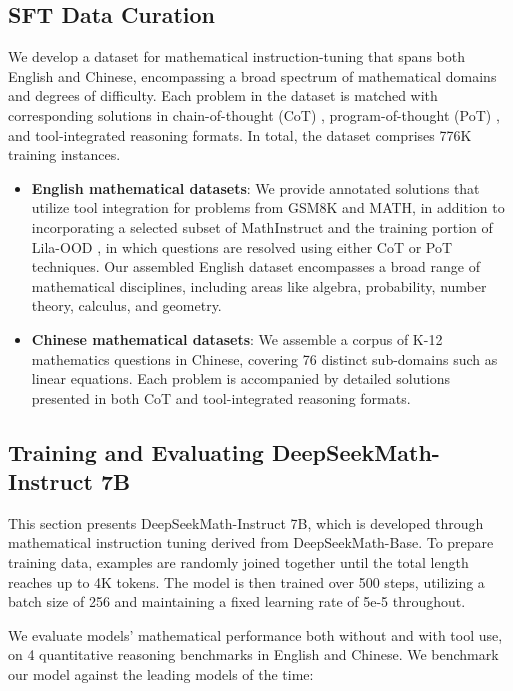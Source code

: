 \begin{itemize}[topsep=0pt]
\subsection{SFT Data Curation}

We develop a dataset for mathematical instruction-tuning that spans both English and Chinese, encompassing a broad spectrum of mathematical domains and degrees of difficulty. Each problem in the dataset is matched with corresponding solutions in chain-of-thought (CoT) \citep{cot}, program-of-thought (PoT) \citep{pot,pal}, and tool-integrated reasoning \citep{tora} formats. In total, the dataset comprises 776K training instances.

\begin{itemize}[topsep=0pt]
    \item \textbf{English mathematical datasets}: We provide annotated solutions that utilize tool integration for problems from GSM8K and MATH, in addition to incorporating a selected subset of MathInstruct \citep{MathInstruct} and the training portion of Lila-OOD \citep{lila}, in which questions are resolved using either CoT or PoT techniques. Our assembled English dataset encompasses a broad range of mathematical disciplines, including areas like algebra, probability, number theory, calculus, and geometry.
    \item \textbf{Chinese mathematical datasets}: We assemble a corpus of K-12 mathematics questions in Chinese, covering 76 distinct sub-domains such as linear equations. Each problem is accompanied by detailed solutions presented in both CoT and tool-integrated reasoning formats.
\end{itemize}

\subsection{Training and Evaluating DeepSeekMath-Instruct 7B}

This section presents DeepSeekMath-Instruct 7B, which is developed through mathematical instruction tuning derived from DeepSeekMath-Base. To prepare training data, examples are randomly joined together until the total length reaches up to 4K tokens. The model is then trained over 500 steps, utilizing a batch size of 256 and maintaining a fixed learning rate of 5e-5 throughout.

We evaluate models' mathematical performance both without and with tool use, on 4 quantitative reasoning benchmarks in English and Chinese. We benchmark our model against the leading models of the time:


\end{itemize}
